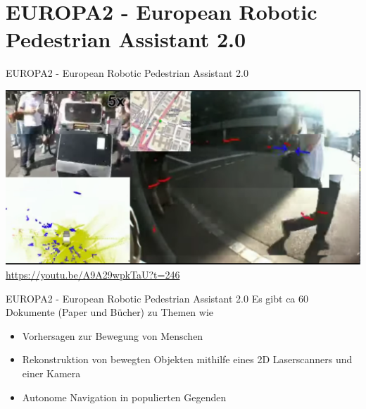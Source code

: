 \documentclass{beamer}
\begin{document}
  \section{EUROPA2 - European Robotic Pedestrian Assistant 2.0}
  \begin{frame}{EUROPA2 - European Robotic Pedestrian Assistant 2.0}
  	\begin{center}
  		\includegraphics[scale=0.15]{img/europa.png} \\
  		\url{https://youtu.be/A9A29wpkTaU?t=246}
  	\end{center}
  \end{frame}
  
  \begin{frame}{EUROPA2 - European Robotic Pedestrian Assistant 2.0}
  	Es gibt ca 60 Dokumente (Paper und Bücher) zu Themen wie
  	\begin{itemize}
  		\item Vorhersagen zur Bewegung von Menschen
  		\item Rekonstruktion von bewegten Objekten mithilfe eines 2D Laserscanners und einer Kamera
  		\item Autonome Navigation in populierten Gegenden
  	\end{itemize}
  \end{frame}
  
\end{document}
